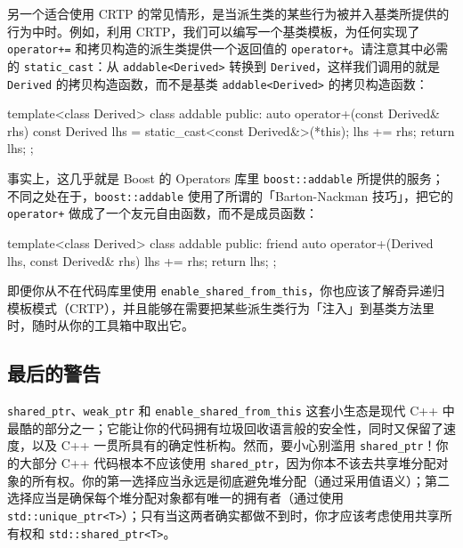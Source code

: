 另一个适合使用 CRTP 的常见情形，是当派生类的某些行为被并入基类所提供的行为中时。例如，利用 CRTP，我们可以编写一个基类模板，为任何实现了 \texttt{operator+=} 和拷贝构造的派生类提供一个返回值的 \texttt{operator+}。请注意其中必需的 \texttt{static\_\allowbreak{}cast}：从 \texttt{addable<\allowbreak{}Derived>\allowbreak{}} 转换到 \texttt{Derived}，这样我们调用的就是 \texttt{Derived} 的拷贝构造函数，而不是基类 \texttt{addable<\allowbreak{}Derived>\allowbreak{}} 的拷贝构造函数：

\begin{codebox}[cpp]
    template<class Derived>
    class addable {
    public:
      auto operator+(const Derived& rhs) const {
        Derived lhs = static_cast<const Derived&>(*this);
        lhs += rhs;
        return lhs;
      }
    };
\end{codebox}

事实上，这几乎就是 Boost 的 Operators 库里 \texttt{boost::\allowbreak{}addable} 所提供的服务；不同之处在于，\texttt{boost::\allowbreak{}addable} 使用了所谓的「Barton-Nackman 技巧」，把它的 \texttt{operator+} 做成了一个友元自由函数，而不是成员函数：

\begin{codebox}[cpp]
    template<class Derived>
    class addable {
    public:
      friend auto operator+(Derived lhs, const Derived& rhs) {
        lhs += rhs;
        return lhs;
      }
    };
\end{codebox}

即便你从不在代码库里使用 \texttt{enable\_\allowbreak{}shared\_\allowbreak{}from\_\allowbreak{}this}，你也应该了解奇异递归模板模式（CRTP），并且能够在需要把某些派生类行为「注入」到基类方法里时，随时从你的工具箱中取出它。

\subsection{最后的警告}

\texttt{shared\_\allowbreak{}ptr}、\texttt{weak\_\allowbreak{}ptr} 和 \texttt{enable\_\allowbreak{}shared\_\allowbreak{}from\_\allowbreak{}this} 这套小生态是现代 C++ 中最酷的部分之一；它能让你的代码拥有垃圾回收语言般的安全性，同时又保留了速度，以及 C++ 一贯所具有的确定性析构。然而，要小心别滥用 \texttt{shared\_\allowbreak{}ptr}！你的大部分 C++ 代码根本不应该使用 \texttt{shared\_\allowbreak{}ptr}，因为你本不该去共享堆分配对象的所有权。你的第一选择应当永远是彻底避免堆分配（通过采用值语义）；第二选择应当是确保每个堆分配对象都有唯一的拥有者（通过使用 \texttt{std::\allowbreak{}unique\_\allowbreak{}ptr<\allowbreak{}T>\allowbreak{}}）；只有当这两者确实都做不到时，你才应该考虑使用共享所有权和 \texttt{std::\allowbreak{}shared\_\allowbreak{}ptr<\allowbreak{}T>\allowbreak{}}。

